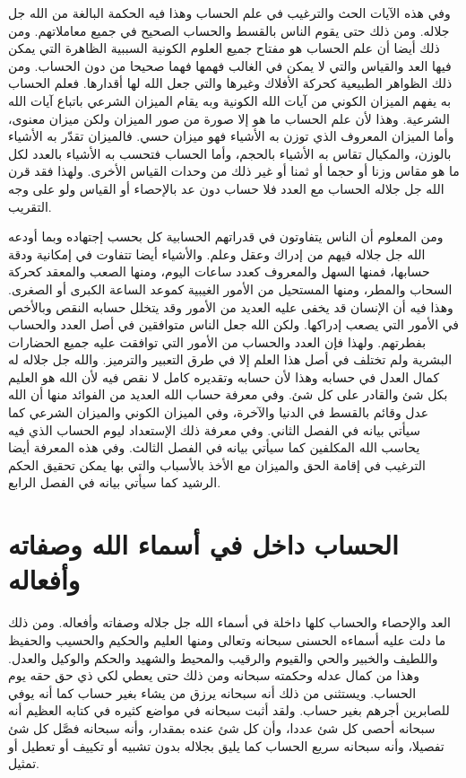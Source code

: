 وفي هذه الآيات الحث والترغيب في علم الحساب وهذا فيه الحكمة البالغة من الله جل جلاله. ومن ذلك حتى يقوم الناس بالقسط والحساب الصحيح في جميع معاملاتهم. ومن ذلك أيضا أن علم الحساب هو مفتاح جميع العلوم الكونية السببية الظاهرة التي يمكن فيها العد والقياس والتي لا يمكن في الغالب فهمها فهما صحيحا من دون الحساب. ومن ذلك الظواهر الطبيعية كحركة الأفلاك وغيرها والتي جعل الله لها أقدارها. فعلم الحساب به يفهم الميزان الكوني من آيات الله الكونية وبه يقام الميزان الشرعي باتباع آيات الله الشرعية. وهذا لأن علم الحساب ما هو إلا صورة من صور الميزان ولكن ميزان معنوى، وأما الميزان المعروف الذي توزن به الأشياء فهو ميزان حسي. فالميزان تقدّر به الأشياء بالوزن، والمكيال تقاس به الأشياء بالحجم، وأما الحساب فتحسب به الأشياء بالعدد لكل ما هو مقاس وزنا أو حجما أو ثمنا أو غير ذلك من وحدات القياس الأخرى. ولهذا فقد قرن الله جل جلاله الحساب مع العدد فلا حساب دون عد بالإحصاء أو القياس ولو على وجه التقريب. 


ومن المعلوم أن الناس يتفاوتون في قدراتهم الحسابية كل بحسب إجتهاده وبما أودعه الله جل جلاله فيهم من إدراك وعقل وعلم. والأشياء أيضا تتفاوت في إمكانية ودقة حسابها، فمنها السهل والمعروف كعدد ساعات اليوم، ومنها الصعب والمعقد كحركة السحاب والمطر، ومنها المستحيل من الأمور الغيبية كموعد الساعة الكبرى أو الصغرى. وهذا فيه أن الإنسان قد يخفى عليه العديد من الأمور وقد يتخلل حسابه النقص وبالأخص في الأمور التي يصعب إدراكها. ولكن الله جعل الناس متوافقين في أصل العدد والحساب بفطرتهم. ولهذا فإن العدد والحساب من الأمور التي توافقت عليه جميع الحضارات البشرية ولم تختلف في أصل هذا العلم إلا في طرق التعبير والترميز. والله جل جلاله له كمال العدل في حسابه وهذا لأن حسابه وتقديره كامل لا نقص فيه لأن الله هو العليم بكل شئ والقادر على كل شئ. وفي معرفة حساب الله العديد من الفوائد منها أن الله عدل وقائم بالقسط في الدنيا والآخرة، وفي الميزان الكوني والميزان الشرعي كما سيأتي بيانه في الفصل الثاني. وفي معرفة ذلك الإستعداد ليوم الحساب الذي فيه يحاسب الله المكلفين كما سيأتي بيانه في الفصل الثالث. وفي هذه المعرفة أيضا الترغيب في إقامة الحق والميزان مع الأخذ بالأسباب والتي بها يمكن تحقيق الحكم الرشيد كما سيأتي بيانه في الفصل الرابع.

\section{الحساب داخل في أسماء الله وصفاته وأفعاله}

العد والإحصاء والحساب كلها داخلة في أسماء الله جل جلاله وصفاته وأفعاله. ومن ذلك ما دلت عليه أسماءه الحسنى سبحانه وتعالى ومنها العليم والحكيم والحسيب والحفيظ واللطيف والخبير والحي والقيوم والرقيب والمحيط والشهيد والحكم والوكيل والعدل. وهذا من كمال عدله وحكمته سبحانه ومن ذلك حتى يعطي لكي ذي حق حقه يوم الحساب. ويستثنى من ذلك أنه سبحانه يرزق من يشاء بغير حساب كما أنه يوفي للصابرين أجرهم بغير حساب. ولقد أثبت سبحانه في مواضع كثيره في كتابه العظيم أنه سبحانه أحصى كل شئ عددا، وأن كل شئ عنده بمقدار، وأنه سبحانه فصَّل كل شئ تفصيلا، وأنه سبحانه سريع الحساب كما يليق بجلاله بدون تشبيه أو تكييف أو تعطيل أو تمثيل. 

